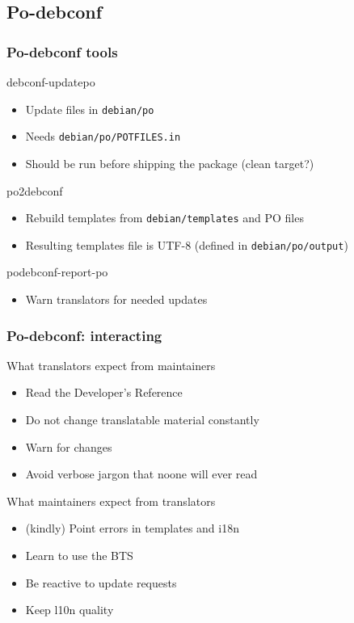 \documentclass{beamer}
\begin{document}
\subsection{Po-debconf}

\begin{frame}
  \frametitle{Po-debconf tools}
	\begin{block}
		{debconf-updatepo}
		\begin{itemize}
		\item
			Update files in \texttt{debian/po}
		\item
			Needs \texttt{debian/po/POTFILES.in}
		\item
			Should be run before shipping the package (clean target?)
		\end{itemize}
	\end{block}
	\begin{block}
		{po2debconf}
		\begin{itemize}
		\item
			Rebuild templates from \texttt{debian/templates} and PO files
		\item
			Resulting templates file is UTF-8 (defined in \texttt{debian/po/output})
		\end{itemize}
	\end{block}
	\begin{block}
		{podebconf-report-po}
		\begin{itemize}
		\item
			Warn translators for needed updates
		\end{itemize}
	\end{block}
\end{frame}

\begin{frame}
  \frametitle{Po-debconf: interacting}
	\begin{block}
		{What translators expect from maintainers}
		\begin{itemize}
		\item
			Read the Developer's Reference
		\item
			Do not change translatable material constantly
		\item
			Warn for changes
		\item
			Avoid verbose jargon that noone will ever read
		\end{itemize}
	\end{block}
	\begin{block}
		{What maintainers expect from translators}
		\begin{itemize}
		\item
			(kindly) Point errors in templates and i18n
		\item
			Learn to use the BTS
		\item
			Be reactive to update requests
		\item
			Keep l10n quality
		\end{itemize}
	\end{block}
\end{frame}
\end{document}
